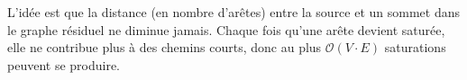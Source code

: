 \documentclass[a4paper]{article}
\begin{document}
L’idée est que la distance (en nombre d’arêtes) entre la source et un sommet dans le graphe résiduel ne diminue jamais. Chaque fois qu’une arête devient saturée, elle ne contribue plus à des chemins courts, donc au plus $\mathcal{O}(V \cdot E)$ saturations peuvent se produire.





\end{document}
